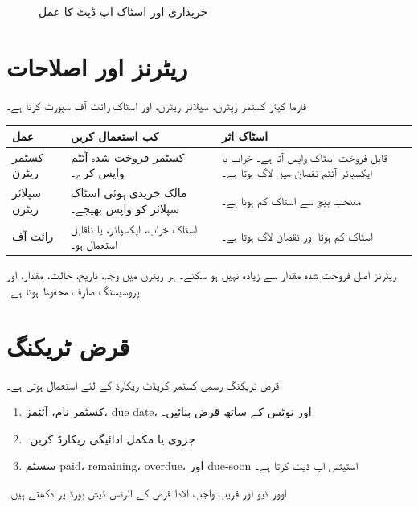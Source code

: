 \documentclass[12pt,a4paper]{article}
\begin{document}
\begin{figure}[H]
\centering
{}
\caption{خریداری اور اسٹاک اپ ڈیٹ کا عمل}
\end{figure}

\section{ریٹرنز اور اصلاحات}
فارما کیئر کسٹمر ریٹرن، سپلائر ریٹرن، اور اسٹاک رائٹ آف سپورٹ کرتا ہے۔

\begin{longtable}{>{\raggedright\arraybackslash}p{3.5cm}>{\raggedright\arraybackslash}p{5cm}>{\raggedright\arraybackslash}p{5cm}}
\toprule
\textbf{عمل} & \textbf{کب استعمال کریں} & \textbf{اسٹاک اثر} \\
\midrule
کسٹمر ریٹرن & کسٹمر فروخت شدہ آئٹم واپس کرے۔ & قابل فروخت اسٹاک واپس آتا ہے۔ خراب یا ایکسپائر آئٹم نقصان میں لاگ ہوتا ہے۔ \\
سپلائر ریٹرن & مالک خریدی ہوئی اسٹاک سپلائر کو واپس بھیجے۔ & منتخب بیچ سے اسٹاک کم ہوتا ہے۔ \\
رائٹ آف & اسٹاک خراب، ایکسپائر، یا ناقابل استعمال ہو۔ & اسٹاک کم ہوتا اور نقصان لاگ ہوتا ہے۔ \\
\bottomrule
\end{longtable}

ریٹرنز اصل فروخت شدہ مقدار سے زیادہ نہیں ہو سکتے۔ ہر ریٹرن میں وجہ، تاریخ، حالت، مقدار، اور پروسیسنگ صارف محفوظ ہوتا ہے۔

\section{قرض ٹریکنگ}
قرض ٹریکنگ رسمی کسٹمر کریڈٹ ریکارڈ کے لئے استعمال ہوتی ہے۔
\begin{enumerate}
  \item کسٹمر نام، آئٹمز، due date، اور نوٹس کے ساتھ قرض بنائیں۔
  \item جزوی یا مکمل ادائیگی ریکارڈ کریں۔
  \item سسٹم paid، remaining، overdue، اور due-soon اسٹیٹس اپ ڈیٹ کرتا ہے۔
\end{enumerate}
اوور ڈیو اور قریب واجب الادا قرض کے الرٹس ڈیش بورڈ پر دکھتے ہیں۔
\end{document}
